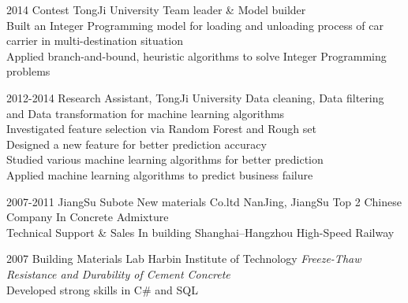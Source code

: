\documentclass[]{friggeri-cv} %
\begin{document}
\begin{entrylist}
\entry
{2014}
{Contest }
{TongJi University}
{Team leader \& Model builder \\
Built an Integer Programming model for loading and unloading process of car carrier in multi-destination situation\\
Applied branch-and-bound, heuristic algorithms to solve Integer Programming problems
}

\entry
{2012-2014}
{Research Assistant, }
{TongJi University}
{Data cleaning, Data filtering and Data transformation for machine learning algorithms\\
 Investigated feature selection via Random Forest and Rough set\\
 Designed a new feature for better prediction accuracy\\
 Studied various machine learning algorithms for better prediction\\
 Applied machine learning algorithms to predict business failure
}



\entry
{2007-2011}
{JiangSu Subote New materials Co.ltd}
{NanJing, JiangSu}
{Top 2 Chinese Company In Concrete Admixture\\
Technical Support \& Sales In building Shanghai–Hangzhou High-Speed Railway\\}


\entry
{2007}
{Building Materials Lab}
{Harbin Institute of Technology}
{\emph{Freeze-Thaw Resistance and Durability of Cement Concrete}\\
Developed strong skills in C\# and SQL\\
}


\end{entrylist}
\end{document}
